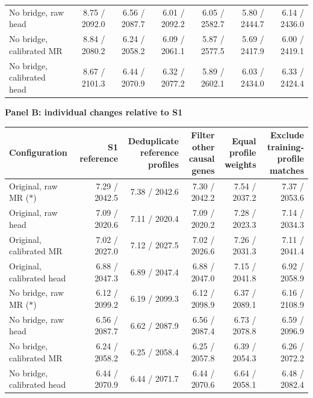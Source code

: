 \begin{landscape}
\begin{table}[p]
\begin{adjustbox}{max width=\linewidth}
\begin{tabular}{lrrrrrr}
No bridge, raw head & 8.75 / 2092.0 & 6.56 / 2087.7 & 6.01 / 2092.2 & 6.05 / 2582.7 & 5.80 / 2444.7 & 6.14 / 2436.0 \\
No bridge, calibrated MR & 8.84 / 2080.2 & 6.24 / 2058.2 & 6.09 / 2061.1 & 5.87 / 2577.5 & 5.69 / 2417.9 & 6.00 / 2419.1 \\
No bridge, calibrated head & 8.67 / 2101.3 & 6.44 / 2070.9 & 6.32 / 2077.2 & 5.89 / 2602.1 & 6.03 / 2434.0 & 6.33 / 2424.4 \\
\bottomrule
\end{tabular}
\end{adjustbox}
\par\medskip
\textbf{Panel B: individual changes relative to S1}\par\smallskip
\begin{adjustbox}{max width=\linewidth}
\begin{tabular}{lrrrrr}
\toprule
Configuration & S1 reference & \shortstack{Deduplicate\\reference profiles} & \shortstack{Filter other\\causal genes} & \shortstack{Equal profile\\weights} & \shortstack{Exclude training-\\profile matches} \\
\midrule
Original, raw MR ($\ast$) & 7.29 / 2042.5 & 7.38 / 2042.6 & 7.30 / 2042.2 & 7.54 / 2037.2 & 7.37 / 2053.6 \\
Original, raw head & 7.09 / 2020.6 & 7.11 / 2020.4 & 7.09 / 2020.2 & 7.28 / 2023.3 & 7.14 / 2034.3 \\
Original, calibrated MR & 7.02 / 2027.0 & 7.12 / 2027.5 & 7.02 / 2026.6 & 7.26 / 2031.3 & 7.11 / 2041.4 \\
Original, calibrated head & 6.88 / 2047.3 & 6.89 / 2047.4 & 6.88 / 2047.0 & 7.15 / 2041.8 & 6.92 / 2058.9 \\
No bridge, raw MR ($\ast$) & 6.12 / 2099.2 & 6.19 / 2099.3 & 6.12 / 2098.9 & 6.37 / 2089.1 & 6.16 / 2108.9 \\
No bridge, raw head & 6.56 / 2087.7 & 6.62 / 2087.9 & 6.56 / 2087.4 & 6.73 / 2078.8 & 6.59 / 2096.9 \\
No bridge, calibrated MR & 6.24 / 2058.2 & 6.25 / 2058.4 & 6.25 / 2057.8 & 6.39 / 2054.3 & 6.26 / 2072.2 \\
No bridge, calibrated head & 6.44 / 2070.9 & 6.44 / 2071.7 & 6.44 / 2070.6 & 6.64 / 2058.1 & 6.48 / 2082.4 \\
\bottomrule
\end{tabular}
\end{adjustbox}
\end{table}
\clearpage
\end{landscape}
